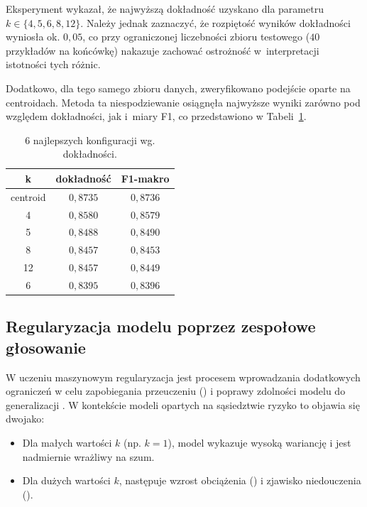 Eksperyment wykazał, że najwyższą dokładność uzyskano dla parametru $k \in \{4, 5, 6, 8, 12\}$. Należy jednak zaznaczyć, że rozpiętość wyników dokładności wyniosła ok. $0{,}05$, co przy ograniczonej liczebności zbioru testowego ($40$ przykładów na końcówkę) nakazuje zachować ostrożność w~interpretacji istotności tych różnic. 

Dodatkowo, dla tego samego zbioru danych, zweryfikowano podejście oparte na centroidach. Metoda ta niespodziewanie osiągnęła najwyższe wyniki zarówno pod względem dokładności, jak i~miary F1, co przedstawiono w Tabeli~\ref{tab:top_configurations}.

\begin{table}[H]
    \centering
    \caption{6 najlepszych konfiguracji wg. dokładności.}
    \label{tab:top_configurations}
    \begin{tabular}{|c|c|c|}
        \hline
        \textbf{k} & \textbf{dokładność} & \textbf{F1-makro} \\ 
        \hline
        centroid & $0{,}8735$ & $0{,}8736$ \\ 
        \hline
        4 & $0{,}8580$ & $0{,}8579$ \\ 
        \hline
        5 & $0{,}8488$ & $0{,}8490$ \\ 
        \hline
        8 & $0{,}8457$ & $0{,}8453$ \\ 
        \hline
        12 & $0{,}8457$ & $0{,}8449$ \\ 
        \hline
        6 & $0{,}8395$ & $0{,}8396$ \\ 
        \hline
    \end{tabular}
\end{table}

\subsection{Regularyzacja modelu poprzez zespołowe głosowanie}

W uczeniu maszynowym regularyzacja jest procesem wprowadzania dodatkowych ograniczeń w celu zapobiegania przeuczeniu () i poprawy zdolności modelu do generalizacji \cite{goodfellow2016}. W kontekście modeli opartych na sąsiedztwie ryzyko to objawia się dwojako:

\begin{itemize}
    \item Dla małych wartości $k$ (np. $k=1$), model wykazuje wysoką wariancję i jest nadmiernie wrażliwy na szum.
    \item Dla dużych wartości $k$, następuje wzrost obciążenia () i zjawisko niedouczenia ().
\end{itemize}


